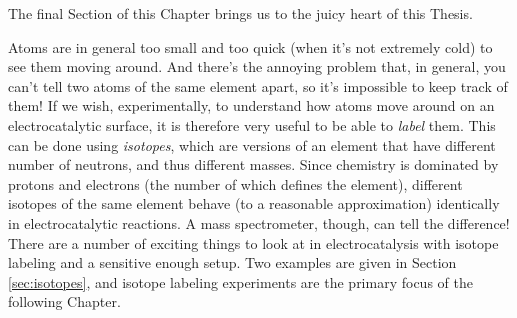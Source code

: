 The final Section of this Chapter brings us to the juicy heart of this Thesis. 

Atoms are in general too small and too quick (when it's not extremely cold) to see them moving around. And there's the annoying problem that, in general, you can't tell two atoms of the same element apart, so it's impossible to keep track of them! If we wish, experimentally, to understand how atoms move around on an electrocatalytic surface, it is therefore very useful to be able to \textit{label} them. This can be done using \textit{isotopes}, which are versions of an element that have different number of neutrons, and thus different masses. Since chemistry is dominated by protons and electrons (the number of which defines the element), different isotopes of the same element behave (to a reasonable approximation) identically in electrocatalytic reactions. A mass spectrometer, though, can tell the difference! There are a number of exciting things to look at in electrocatalysis with isotope labeling and a sensitive enough setup. Two examples are given in Section \ref{sec:isotopes}, and isotope labeling experiments are the primary focus of the following Chapter.

